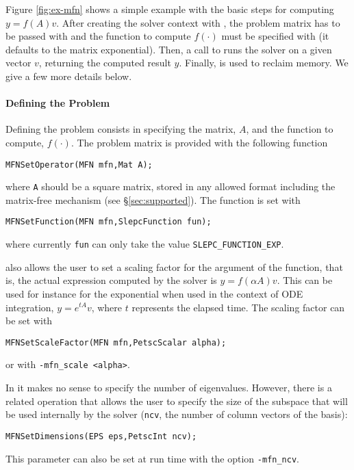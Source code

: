 Figure \ref{fig:ex-mfn} shows a simple example with the basic steps for computing $y=f(A)v$. After creating the solver context with , the problem matrix has to be passed with  and the function to compute $f(\cdot)$ must be specified with  (it defaults to the matrix exponential). Then, a call to  runs the solver on a given vector $v$, returning the computed result $y$. Finally,  is used to reclaim memory. We give a few more details below.

\paragraph{Defining the Problem}

Defining the problem consists in specifying the matrix, $A$, and the function to compute, $f(\cdot)$. The problem matrix is provided with the following function
	\begin{Verbatim}[fontsize=\small]
	MFNSetOperator(MFN mfn,Mat A);
	\end{Verbatim}
where \texttt{A} should be a square matrix, stored in any allowed \petsc format including the matrix-free mechanism (see \S\ref{sec:supported}). The function is set with
	\begin{Verbatim}[fontsize=\small]
	MFNSetFunction(MFN mfn,SlepcFunction fun);
	\end{Verbatim}
where currently \texttt{fun} can only take the value \texttt{SLEPC\_FUNCTION\_EXP}.

 also allows the user to set a scaling factor for the argument of the function, that is, the actual expression computed by the solver is $y=f(\alpha A)v$. This can be used for instance for the exponential when used in the context of ODE integration, $y=e^{tA}v$, where $t$ represents the elapsed time. The scaling factor can be set with
	\begin{Verbatim}[fontsize=\small]
	MFNSetScaleFactor(MFN mfn,PetscScalar alpha);
	\end{Verbatim}
or with \Verb!-mfn_scale <alpha>!.

In  it makes no sense to specify the number of eigenvalues. However, there is a related operation that allows the user to specify the size of the subspace that will be used internally by the solver (\texttt{ncv}, the number of column vectors of the basis):
	\begin{Verbatim}[fontsize=\small]
	MFNSetDimensions(EPS eps,PetscInt ncv);
	\end{Verbatim}
This parameter can also be set at run time with the option \Verb!-mfn_ncv!.

